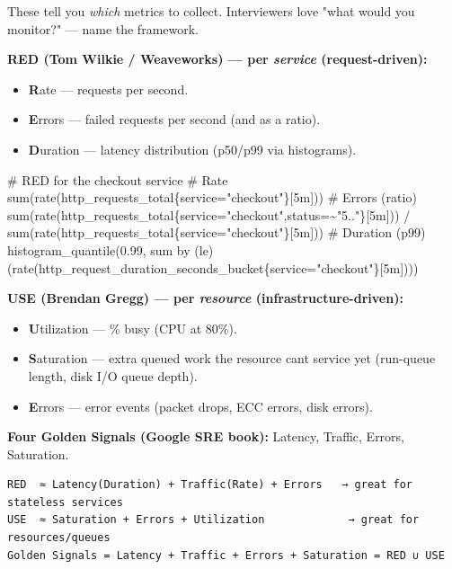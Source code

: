 \documentclass[11pt]{article}
\providecommand{\tightlist}{\setlength{\itemsep}{1pt}\setlength{\parskip}{0pt}}
\newenvironment{Shaded}{\begin{snugshade}}{\end{snugshade}}
\newcommand{\NormalTok}[1]{\textcolor[rgb]{0.81,0.81,0.76}{#1}}
\begin{document}
These tell you \emph{which} metrics to collect. Interviewers love "what would you monitor?" --- name the framework.

\textbf{RED (Tom Wilkie / Weaveworks) --- per \emph{service} (request-driven):}

\begin{itemize}
\tightlist
\item
  \textbf{R}ate --- requests per second.
\item
  \textbf{E}rrors --- failed requests per second (and as a ratio).
\item
  \textbf{D}uration --- latency distribution (p50/p99 via histograms).
\end{itemize}


\begin{Shaded}
\begin{Highlighting}[]
\NormalTok{\# RED for the checkout service}
\NormalTok{\# Rate}
\NormalTok{sum(rate(http\_requests\_total\{service="checkout"\}[5m]))}
\NormalTok{\# Errors (ratio)}
\NormalTok{sum(rate(http\_requests\_total\{service="checkout",status=\textasciitilde{}"5.."\}[5m]))}
\NormalTok{  / sum(rate(http\_requests\_total\{service="checkout"\}[5m]))}
\NormalTok{\# Duration (p99)}
\NormalTok{histogram\_quantile(0.99,}
\NormalTok{  sum by (le) (rate(http\_request\_duration\_seconds\_bucket\{service="checkout"\}[5m])))}
\end{Highlighting}
\end{Shaded}

\textbf{USE (Brendan Gregg) --- per \emph{resource} (infrastructure-driven):}

\begin{itemize}
\tightlist
\item
  \textbf{U}tilization --- \% busy (CPU at 80\%).
\item
  \textbf{S}aturation --- extra queued work the resource can\textquotesingle t service yet (run-queue length, disk I/O queue depth).
\item
  \textbf{E}rrors --- error events (packet drops, ECC errors, disk errors).
\end{itemize}

\textbf{Four Golden Signals (Google SRE book):} Latency, Traffic, Errors, Saturation.

\setcodelang{}

\begin{verbatim}
RED  ≈ Latency(Duration) + Traffic(Rate) + Errors   → great for stateless services
USE  ≈ Saturation + Errors + Utilization             → great for resources/queues
Golden Signals = Latency + Traffic + Errors + Saturation = RED ∪ USE
\end{verbatim}
\end{document}
